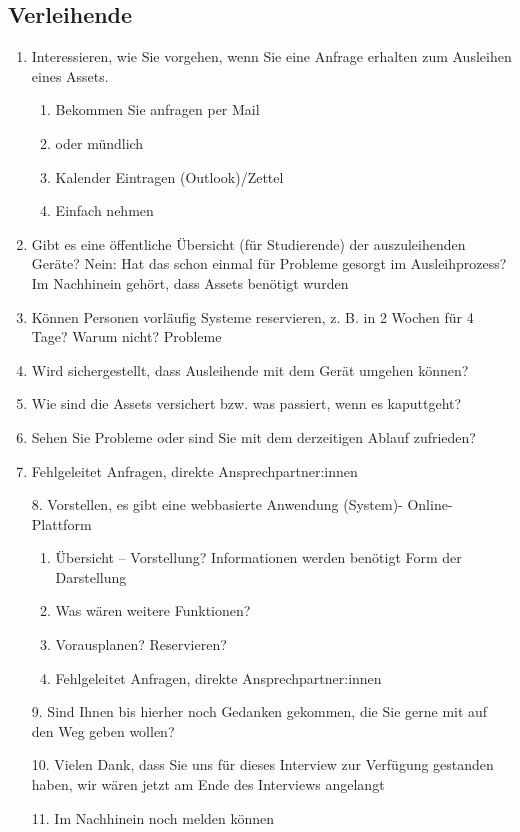 \subsection{Verleihende}
{\sffamily\color{maincolor}{Abschnitt: Jetzt}}
\begin{enumerate}
    \item Interessieren, wie Sie vorgehen, wenn Sie eine Anfrage erhalten zum Ausleihen eines
    Assets. 
        \begin{enumerate} 
            \item Bekommen Sie anfragen per Mail 
            \item oder mündlich 
            \item Kalender Eintragen (Outlook)/Zettel
            \item Einfach nehmen
        \end{enumerate}
    \item Gibt es eine öffentliche Übersicht (für Studierende) der auszuleihenden Geräte? Nein: Hat
    das schon einmal für Probleme gesorgt im Ausleihprozess? Im Nachhinein gehört, dass Assets
    benötigt wurden
    \item Können Personen vorläufig Systeme reservieren, z. B. in 2 Wochen für 4 Tage? 
    Warum nicht? Probleme    
    \item Wird sichergestellt, dass Ausleihende mit dem Gerät umgehen können? 
    \item Wie sind die Assets versichert bzw. was passiert, wenn es kaputtgeht?
    \item Sehen Sie Probleme oder sind Sie mit dem derzeitigen Ablauf zufrieden?
    \item Fehlgeleitet Anfragen, direkte Ansprechpartner:innen
\end{enumerate}

{\sffamily\color{maincolor}{Abschnitt: Visionen und Ziele}}
\begin{enumerate}
    \item[8.] Vorstellen, es gibt eine webbasierte Anwendung (System)- Online-Plattform
    \begin{enumerate} 
        \item Übersicht – Vorstellung?
        Informationen werden benötigt
        Form der Darstellung        
        \item Was wären weitere Funktionen?
        \item Vorausplanen? Reservieren?
        \item Fehlgeleitet Anfragen, direkte Ansprechpartner:innen
    \end{enumerate}
    \item[9.] Sind Ihnen bis hierher noch Gedanken gekommen, die Sie gerne mit auf den Weg geben wollen? 
    \item[10.] Vielen Dank, dass Sie uns für dieses Interview zur Verfügung gestanden haben, wir wären jetzt am Ende des Interviews angelangt
    \item[11.] Im Nachhinein noch melden können
\end{enumerate}

